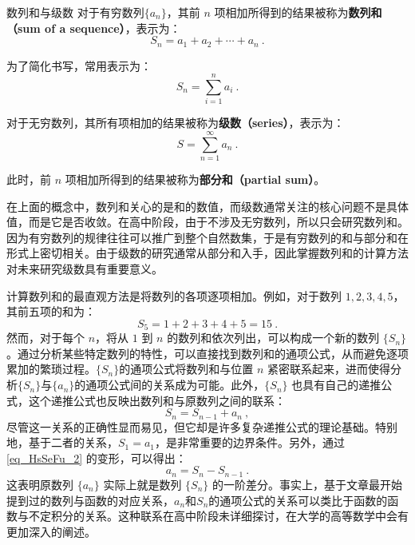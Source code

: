 \begin{definition}{数列和与级数}
对于有穷数列$\{a_n\}$，其前 $n$ 项相加所得到的结果被称为\textbf{数列和（sum of a sequence）}，表示为：
\begin{equation}
S_n = a_1 + a_2 + \cdots + a_n~.
\end{equation}

为了简化书写，常用表示为：
\begin{equation}
S_n = \sum_{i=1}^n a_i~.
\end{equation}

对于无穷数列，其所有项相加的结果被称为\textbf{级数（series）}，表示为：
\begin{equation}
S = \sum_{n=1}^\infty a_n~.
\end{equation}

此时，前 $n$ 项相加所得到的结果被称为\textbf{部分和（partial sum）}。
\end{definition}

在上面的概念中，数列和关心的是和的数值，而级数通常关注的核心问题不是具体值，而是它是否收敛。在高中阶段，由于不涉及无穷数列，所以只会研究数列和。因为有穷数列的规律往往可以推广到整个自然数集，于是有穷数列的和与部分和在形式上密切相关。由于级数的研究通常从部分和入手，因此掌握数列和的计算方法对未来研究级数具有重要意义。

计算数列和的最直观方法是将数列的各项逐项相加。例如，对于数列 $1, 2, 3, 4, 5$，其前五项的和为：
$$
S_5 = 1 + 2 + 3 + 4 + 5 = 15~.
$$
然而，对于每个 $n$，将从 $1$ 到 $n$ 的数列和依次列出，可以构成一个新的数列 $\{S_n\}$。通过分析某些特定数列的特性，可以直接找到数列和的通项公式，从而避免逐项累加的繁琐过程。$\{S_n\}$的通项公式将数列和与位置 $n$ 紧密联系起来，进而使得分析$\{S_n\}$与$\{a_n\}$的通项公式间的关系成为可能。此外，$\{S_n\}$ 也具有自己的递推公式，这个递推公式也反映出数列和与原数列之间的联系：
\begin{equation}\label{eq_HsSeFu_2}
S_n = S_{n-1} + a_n~,
\end{equation}
尽管这一关系的正确性显而易见，但它却是许多复杂递推公式的理论基础。特别地，基于二者的关系，$S_1=a_1$，是非常重要的边界条件。另外，通过\autoref{eq_HsSeFu_2} 的变形，可以得出：
\begin{equation}
a_n = S_n - S_{n-1}~.
\end{equation}
这表明原数列 $\{a_n\}$ 实际上就是数列 $\{S_n\}$ 的一阶差分。事实上，基于文章最开始提到过的数列与函数的对应关系，$a_n$和$S_n$的通项公式的关系可以类比于函数的函数与不定积分的关系。这种联系在高中阶段未详细探讨，在大学的高等数学中会有更加深入的阐述。

